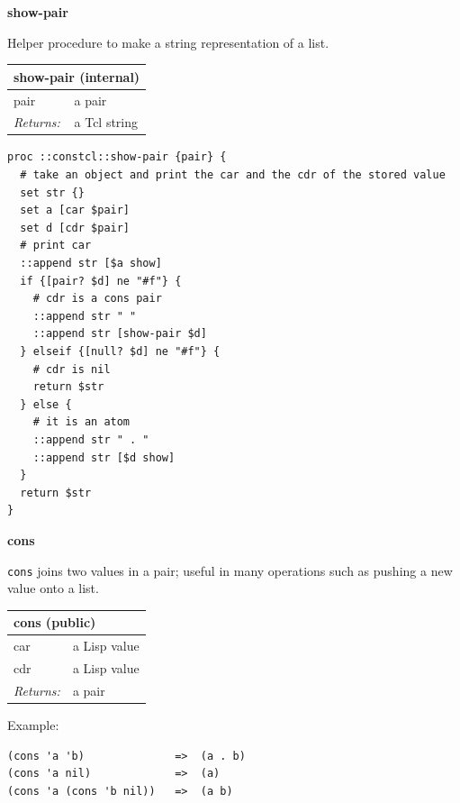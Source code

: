 \documentclass[twoside,9pt]{report}
\begin{document}
\textbf{show-pair}


Helper procedure to make a string representation of a list.

\begin{tabular}{ |l l| }
\hline
\multicolumn{2}{|l|}{show-pair (internal)} \\
\hline
pair & a pair \\
\textit{Returns:} & a Tcl string \\
\hline
\end{tabular}

\noindent\makebox[\linewidth]{\rule{\linewidth}{0.4pt}}
\begin{lstlisting}
proc ::constcl::show-pair {pair} {
  # take an object and print the car and the cdr of the stored value
  set str {}
  set a [car $pair]
  set d [cdr $pair]
  # print car
  ::append str [$a show]
  if {[pair? $d] ne "#f"} {
    # cdr is a cons pair
    ::append str " "
    ::append str [show-pair $d]
  } elseif {[null? $d] ne "#f"} {
    # cdr is nil
    return $str
  } else {
    # it is an atom
    ::append str " . "
    ::append str [$d show]
  }
  return $str
}
\end{lstlisting}
\noindent\makebox[\linewidth]{\rule{\linewidth}{0.4pt}}

\textbf{cons}


\texttt{cons} joins two values in a pair; useful in many operations such as pushing a new value onto a list.

\begin{tabular}{ |l l| }
\hline
\multicolumn{2}{|l|}{cons (public)} \\
\hline
car & a Lisp value \\
cdr & a Lisp value \\
\textit{Returns:} & a pair \\
\hline
\end{tabular}


Example:

\noindent\makebox[\linewidth]{\rule{\linewidth}{0.4pt}}
\begin{lstlisting}
(cons 'a 'b)              =>  (a . b)
(cons 'a nil)             =>  (a)
(cons 'a (cons 'b nil))   =>  (a b)
\end{lstlisting}
\noindent\makebox[\linewidth]{\rule{\linewidth}{0.4pt}}
\end{document}
